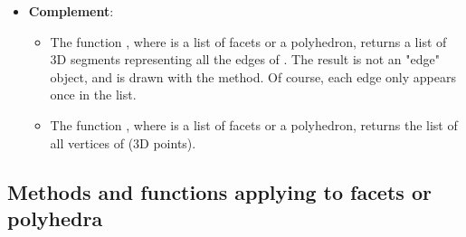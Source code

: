 \begin{itemize}
    \item \textbf{Complement}:
\begin{itemize}
    \item The function , where  is a list of facets or a polyhedron, returns a list of 3D segments representing all the edges of . The result is not an "edge" object, and is drawn with the  method. Of course, each edge only appears once in the list.
     \item The function , where  is a list of facets or a polyhedron, returns the list of all vertices of  (3D points).
\end{itemize}
\end{itemize}

\subsection{Methods and functions applying to facets or polyhedra}

